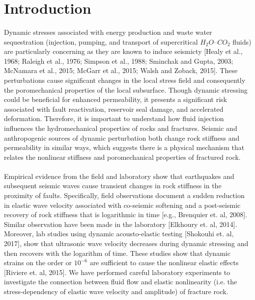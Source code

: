\documentclass[letterpaper,10pt]{article}
\begin{document}

\section{Introduction}
\paragraph{} Dynamic stresses associated with energy production and waste water sequestration (injection, pumping, and transport of supercritical $H_{2}O$--$CO_{2}$ fluids) are particularly concerning as they are known to induce seismicty [Healy et al., 1968; Raleigh et al., 1976; Simpson et al., 1988; Sminchak and Gupta, 2003; McNamara et al., 2015; McGarr et al., 2015; Walsh and Zoback, 2015]. These perturbations cause significant changes in the local stress field and consequently the poromechanical properties of the local subsurface.
Though dynamic stressing could be beneficial for enhanced permeability, it presents a significant risk associated with fault reactivation, reservoir seal damage, and accelerated deformation. 
Therefore, it is important to understand how fluid injection influences the hydromechanical properties of rocks and fractures. Seismic and anthropogenic sources of dynamic perturbation both change rock stiffness and permeability in similar ways, which suggests there is a physical mechanism that relates the nonlinear stiffness and poromechanical properties of fractured rock.

\paragraph{}
Empirical evidence from the field and laboratory show that earthquakes and subsequent seismic waves cause transient changes in rock stiffness in the proximity of faults. Specifically, field observations document a sudden reduction in elastic wave velocity associated with co-seismic softening and a post-seismic recovery of rock stiffness that is logarithmic in time [e.g., Brenquier et. al, 2008]. Similar observation have been made in the laboratory [Elkhoury et. al, 2014]. Moreover, lab studies using dynamic acousto-elastic testing [Shokouhi et. al, 2017], show that ultrasonic wave velocity decreases during dynamic stressing and then recovers with the logarithm of time. These studies show that dynamic strains on the order or $ 10^{-6} $ are sufficient to cause the nonlinear elastic effects [Riviere et. al, 2015]. We have performed careful laboratory experiments to investigate the connection between fluid flow and elastic nonlinearity (i.e. the stress-dependency of elastic wave velocity and amplitude) of fracture rock. 
\end{document}
